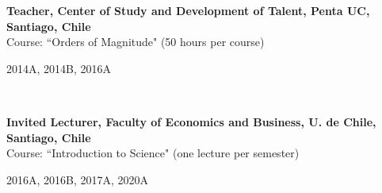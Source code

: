 \documentclass[12pt, a4paper]{article} %
\begin{document}
\begin{minipage}[t]{0.7\textwidth}
\begin{flushleft}%
  \setlength{\leftskip}{0.2cm}%
\textbf{Teacher, Center of Study and Development of Talent, Penta UC, Santiago, Chile}\\
Course: ``Orders of Magnitude" (50 hours per course)
\end{flushleft}
\end{minipage}
\begin{minipage}[t]{0.3\textwidth}
\hfill 2014A, 2014B, 2016A
\end{minipage}\\

\begin{minipage}[t]{0.7\textwidth}
\begin{flushleft}%
  \setlength{\leftskip}{0.2cm}%
\textbf{Invited Lecturer, Faculty of Economics and Business, U. de Chile, Santiago, Chile}\\
Course: ``Introduction to Science" (one lecture per semester)
\end{flushleft}
\end{minipage}
\begin{minipage}[t]{0.3\textwidth}
\hfill 2016A, 2016B, 2017A, 2020A
\end{minipage}
\end{document}
